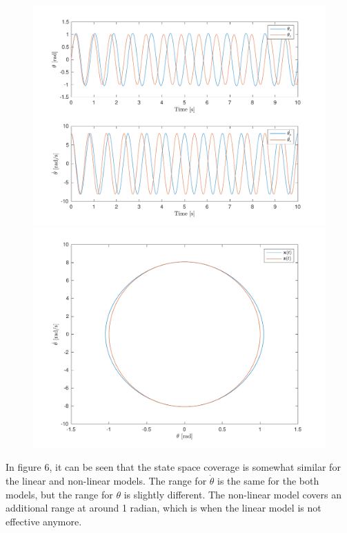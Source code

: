 \documentclass[10pt]{article}
\begin{document}
\begin{figure}[ht]
    \centering
    \begin{minipage}[b]{0.45\textwidth}
        \centering
        \includegraphics[width=1\linewidth]{lab1/figs/section5_X0_1_state_evolution.pdf}
    \end{minipage}
    \begin{minipage}[b]{0.45\textwidth}
        \centering
        \includegraphics[width=1\linewidth]{lab1/figs/section5_X0_1_state_orbit.pdf}
    \end{minipage}
    
    \label{figure:x_0_1_state_evolution}
\end{figure}
    In figure 6, it can be seen that the state space coverage is somewhat similar for the linear and non-linear models. The range for $\dot{\theta}$ is the same for the both models, but the range for $\theta$ is slightly different. The non-linear model covers an additional range at around 1 radian, which is when the linear model is not effective anymore.
    
\end{document}
